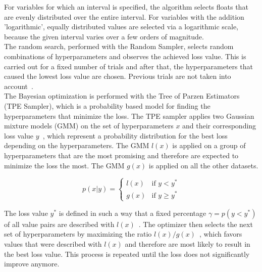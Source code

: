 
For variables for which an interval is specified, the algorithm selects floats that are evenly distributed over the entire interval. For variables with the addition
'logarithmic', equally distributed values are selected via a logarithmic scale, because the given interval varies over a few orders of magnitude. \\

The random search, performed with the Random Sampler, selects random combinations of hyperparameters and observes the achieved loss value. This is carried out for a fixed number of trials and after that, the
hyperparameters that caused the lowest loss value are chosen. Previous trials are not taken into account~\cite{hpalg:2011}. \\

The Bayesian optimization is performed with the Tree of Parzen Estimators (TPE Sampler), which is a probability based model for finding the hyperparameters that minimize the loss.
The TPE sampler applies two Gaussian mixture models (GMM) on the set of hyperparameters $x$ and their corresponding loss value $y$~\cite{hpsearch:2012}, which represent a probability distribution for the best
loss depending on the hyperparameters. The GMM $l(x)$ is applied on a group of hyperparameters that are the most promising and therefore are expected to minimize the loss the most. The GMM $g(x)$ is applied on all the other datasets. 

\[
p(x|y) =
\left\{
\begin{array}{ll}
    l(x) & \text{if } y < y^* \\
    g(x)  & \text{if } y \geq y^*
\end{array}
\right.
\]

The loss value $y^*$ is defined in such a way that a fixed percentage $\gamma = p(y < y^*)$ of all value pairs are described with $l(x)$~\cite{hpalg:2011}.
The optimizer then selects the next set of hyperparameters by maximizing the ratio $l(x)/g(x)$~\cite{hpsearch:2012}, which favors values that were described with $l(x)$ and
therefore are most likely to result in the best loss value.
This process is repeated until the loss does not significantly improve anymore.